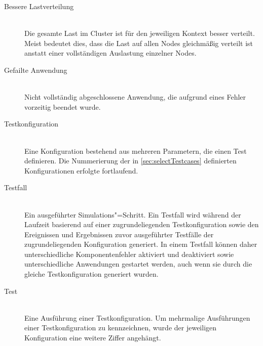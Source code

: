 \begin{description}
    \item [Bessere Lastverteilung] \hfill \\
        Die gesamte Last im Cluster ist für den jeweiligen Kontext besser verteilt.
        Meist bedeutet dies, dass die Last auf allen Nodes gleichmäßig verteilt ist anstatt einer vollständigen Auslastung einzelner Nodes.
    \item [Gefailte Anwendung] \hfill \\
        Nicht vollständig abgeschlossene Anwendung, die aufgrund eines Fehler vorzeitig beendet wurde.
    \item [Testkonfiguration] \hfill \\
        Eine Konfiguration bestehend aus mehreren Parametern, die einen Test definieren.
        Die Nummerierung der in \autoref{sec:selectTestcases} definierten Konfigurationen erfolgte fortlaufend.
    \item [Testfall] \hfill \\
        Ein ausgeführter Simulations"=Schritt.
        Ein Testfall wird während der Laufzeit basierend auf einer zugrundeliegenden Testkonfiguration sowie den Ereignissen und Ergebnissen zuvor ausgeführter Testfälle der zugrundeliegenden Konfiguration generiert.
        In einem Testfall können daher unterschiedliche Komponentenfehler aktiviert und deaktiviert sowie unterschiedliche Anwendungen gestartet werden, auch wenn sie durch die gleiche Testkonfiguration generiert wurden.
    \item [Test] \hfill \\
        Eine Ausführung einer Testkonfiguration.
        Um mehrmalige Ausführungen einer Testkonfiguration zu kennzeichnen, wurde der jeweiligen Konfiguration eine weitere Ziffer angehängt.
\end{description}
